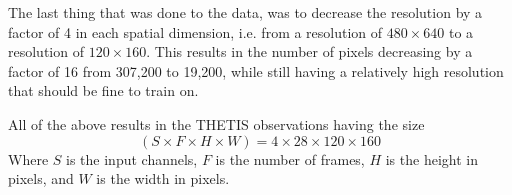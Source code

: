 The last thing that was done to the data, was to decrease the resolution by a factor of 4 in each spatial dimension, i.e. from a resolution of $480\times 640$ to a resolution of $120\times 160$. This results in the number of pixels decreasing by a factor of 16 from 307,200 to 19,200, while still having a relatively high resolution that should be fine to train on. 

All of the above results in the THETIS observations having the size \begin{equation}
    (S \times F \times H \times W) = 4\times 28 \times 120 \times 160
\end{equation}
Where $S$ is the input channels, $F$ is the number of frames, $H$ is the height in pixels, and $W$ is the width in pixels.